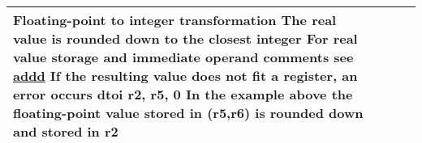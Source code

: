 \documentclass{article}
\newcommand{\St}[1]{{\fontfamily{qcr}\selectfont #1}}
\begin{document}
{\begin{table*}[h!]
\begin{tabular}{| >{\centering\arraybackslash} m{1cm} | >{\centering\arraybackslash} m{1.4cm} | >{\centering\arraybackslash} m{1.2cm} | m{11.6cm} |}
 Floating-point to integer transformation \newline
 The real value is rounded down to the closest integer \newline
 For real value storage and immediate operand comments see \hyperlink{addd}{\St{addd}} \newline
 If the resulting value does not fit a register, an error occurs \newline
 \St{dtoi r2, r5, 0} \newline
 In the example above the floating-point value stored in \St{(r5,r6)} \newline
 is rounded down and stored in \St{r2} \\
 
 \hline

\end{tabular}
\end{table*}
}

\newpage
\end{document}
